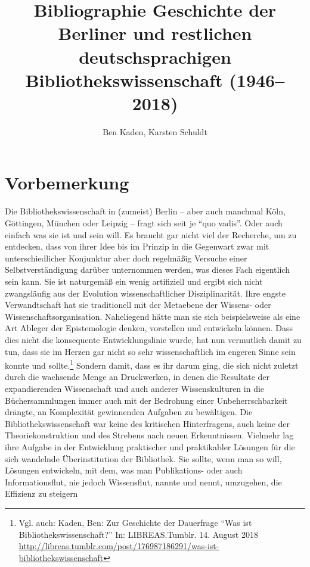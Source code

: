 \documentclass[a4paper,
fontsize=11pt,
oneside,
numbers=noperiodatend,
parskip=half-,
bibliography=totoc,
final
]{scrartcl}
\title{\LARGE{Bibliographie Geschichte der Berliner und restlichen deutschsprachigen Bibliothekswissenschaft (1946–2018)}}%
\author{Ben Kaden, Karsten Schuldt} %
\date{}
\begin{document}
\maketitle
\thispagestyle{fancyplain} 


\hypertarget{vorbemerkung}{%
\section{Vorbemerkung}\label{vorbemerkung}}

Die Bibliothekswissenschaft in (zumeist) Berlin -- aber auch manchmal
Köln, Göttingen, München oder Leipzig -- fragt sich seit je \enquote{quo
vadis}. Oder auch einfach was sie ist und sein will. Es braucht gar
nicht viel der Recherche, um zu entdecken, dass von ihrer Idee bis im
Prinzip in die Gegenwart zwar mit unterschiedlicher Konjunktur aber doch
regelmäßig Versuche einer Selbstverständigung darüber unternommen
werden, was dieses Fach eigentlich sein kann. Sie ist naturgemäß ein
wenig artifiziell und ergibt sich nicht zwangsläufig aus der Evolution
wissenschaftlicher Disziplinarität. Ihre engste Verwandtschaft hat sie
traditionell mit der Metaebene der Wissens- oder
Wissenschaftsorganisation. Naheliegend hätte man sie sich beispielsweise
als eine Art Ableger der Epistemologie denken, vorstellen und entwickeln
können. Dass dies nicht die konsequente Entwicklungslinie wurde, hat nun
vermutlich damit zu tun, dass sie im Herzen gar nicht so sehr
wissenschaftlich im engeren Sinne sein konnte und sollte.\footnote{Vgl.
  auch: Kaden, Ben: Zur Geschichte der Dauerfrage \enquote{Was ist
  Bibliothekswissenschaft?} In: LIBREAS.Tumblr. 14. August 2018
  \url{http://libreas.tumblr.com/post/176987186291/was-ist-bibliothekswissenschaft}}
Sondern damit, dass es ihr darum ging, die sich nicht zuletzt durch die
wachsende Menge an Druckwerken, in denen die Resultate der
expandierenden Wissenschaft und auch anderer Wissenskulturen in die
Büchersammlungen immer auch mit der Bedrohung einer Unbeherrschbarkeit
drängte, an Komplexität gewinnenden Aufgaben zu bewältigen. Die
Bibliothekswissenschaft war keine des kritischen Hinterfragens, auch
keine der Theoriekonstruktion und des Strebens nach neuen Erkenntnissen.
Vielmehr lag ihre Aufgabe in der Entwicklung praktischer und
praktikabler Lösungen für die sich wandelnde Überinstitution der
Bibliothek. Sie sollte, wenn man so will, Lösungen entwickeln, mit dem,
was man Publikations- oder auch Informationsflut, nie jedoch
Wissensflut, nannte und nennt, umzugehen, die Effizienz zu steigern
\end{document}

